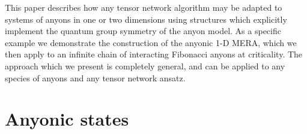 \documentclass[aps,prb,reprint,superscriptaddress,amsfonts,amsmath,amssymb,showpacs,floatfix]{revtex4-1}
\begin{document}
This paper describes how any tensor network algorithm may be adapted to systems of anyons in one or two dimensions using structures which explicitly implement the quantum group symmetry of the anyon model. As a specific example we demonstrate the construction of the anyonic {1-D} MERA, which we then apply to an infinite chain of interacting Fibonacci anyons at criticality.
The approach which we present is %
completely general, and can be applied to any species of anyons and any tensor network ansatz.



\section{Anyonic states\label{sec:anyonstates}}
\end{document}
